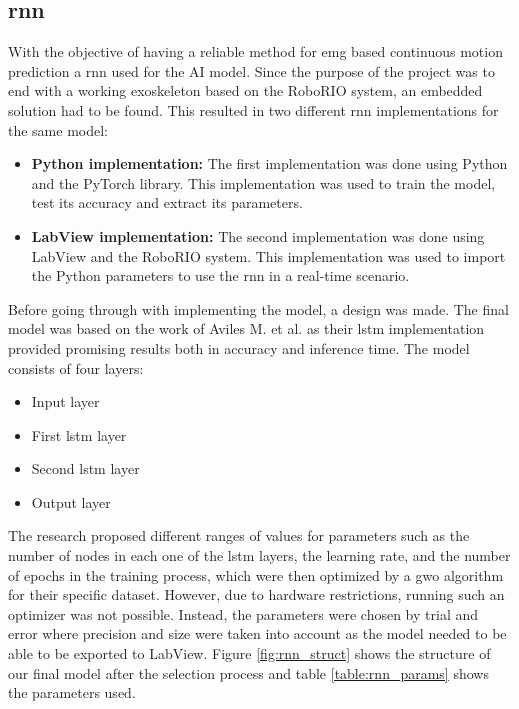 \subsection{\acrfull{rnn}}
With the objective of having a reliable method for \acrshort{emg} based continuous motion prediction a \acrshort{rnn} used for the AI model. 
Since the purpose of the project was to end with a working exoskeleton based 
on the RoboRIO system, an embedded solution had to be found. This resulted in two different \acrshort{rnn} 
implementations for the same model:
\begin{itemize}

    \item \textbf{Python implementation:} The first implementation was done using Python and the PyTorch library. 
    This implementation was used to train the model, test its accuracy and extract its parameters.
    
    \item \textbf{LabView implementation:} The second implementation was done using LabView and the RoboRIO system. 
    This implementation was used to import the Python parameters to use the \acrshort{rnn} in a real-time scenario.

\end{itemize}

Before going through with implementing the model, a design was made. The final model was based on the work of Aviles M. et al. \cite{RNNEMG} 
as their \acrfull{lstm} implementation provided promising results both in accuracy and inference time. The model consists 
of four layers:
\begin{itemize}

    \item Input layer

    \item First \acrshort{lstm} layer

    \item Second \acrshort{lstm} layer
    
    \item Output layer

\end{itemize}

The research \cite{RNNEMG} proposed different ranges of values for parameters such as the number of nodes in each one of the \acrshort{lstm} 
layers, the learning rate, and the number of epochs in the training process, which were then optimized by a \acrfull{gwo} 
algorithm for their specific dataset. However, due to hardware restrictions, running such an optimizer was not possible. Instead, 
the parameters were chosen by trial and error where precision and size were taken into account as the model needed to be able to be 
exported to LabView. Figure \ref{fig:rnn_struct} shows the structure of our final model after 
the selection process and table \ref{table:rnn_params} shows the parameters used.


